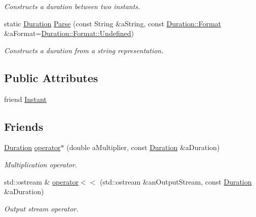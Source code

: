 \begin{DoxyCompactItemize}
\begin{DoxyCompactList}\small\item\em Constructs a duration between two instants. \end{DoxyCompactList}\item 
static \hyperlink{classostk_1_1physics_1_1time_1_1_duration}{Duration} \hyperlink{classostk_1_1physics_1_1time_1_1_duration_afe4136976a7c4e5c2ec00c0aa5583b18}{Parse} (const String \&a\+String, const \hyperlink{classostk_1_1physics_1_1time_1_1_duration_a4bf616b67d15e0fbc4beb4fcc306c368}{Duration\+::\+Format} \&a\+Format=\hyperlink{classostk_1_1physics_1_1time_1_1_duration_a4bf616b67d15e0fbc4beb4fcc306c368aec0fc0100c4fc1ce4eea230c3dc10360}{Duration\+::\+Format\+::\+Undefined})
\begin{DoxyCompactList}\small\item\em Constructs a duration from a string representation. \end{DoxyCompactList}\end{DoxyCompactItemize}
\subsection*{Public Attributes}
\begin{DoxyCompactItemize}
\item 
friend \hyperlink{classostk_1_1physics_1_1time_1_1_duration_a262e3e2ea8f8c82f81028ef055114add}{Instant}
\end{DoxyCompactItemize}
\subsection*{Friends}
\begin{DoxyCompactItemize}
\item 
\hyperlink{classostk_1_1physics_1_1time_1_1_duration}{Duration} \hyperlink{classostk_1_1physics_1_1time_1_1_duration_a30be5772f32cb400f8d8a8e2975abf6d}{operator$\ast$} (double a\+Multiplier, const \hyperlink{classostk_1_1physics_1_1time_1_1_duration}{Duration} \&a\+Duration)
\begin{DoxyCompactList}\small\item\em Multiplication operator. \end{DoxyCompactList}\item 
std\+::ostream \& \hyperlink{classostk_1_1physics_1_1time_1_1_duration_a82573aea35c8642b571f78c85ca70fbc}{operator$<$$<$} (std\+::ostream \&an\+Output\+Stream, const \hyperlink{classostk_1_1physics_1_1time_1_1_duration}{Duration} \&a\+Duration)
\begin{DoxyCompactList}\small\item\em Output stream operator. \end{DoxyCompactList}\end{DoxyCompactItemize}


